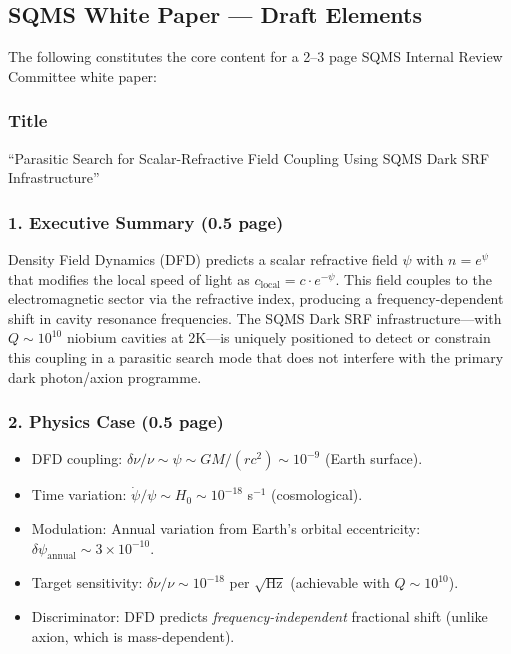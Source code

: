 \documentclass[11pt,a4paper]{article}
\begin{document}
\subsection{SQMS White Paper --- Draft Elements}

The following constitutes the core content for a 2--3 page SQMS Internal Review Committee white paper:

\subsubsection{Title}
``Parasitic Search for Scalar-Refractive Field Coupling Using SQMS Dark SRF Infrastructure''

\subsubsection{1. Executive Summary (0.5 page)}

Density Field Dynamics (DFD) predicts a scalar refractive field $\psi$ with $n = e^\psi$ that modifies the local speed of light as $c_\mathrm{local} = c \cdot e^{-\psi}$. This field couples to the electromagnetic sector via the refractive index, producing a frequency-dependent shift in cavity resonance frequencies. The SQMS Dark SRF infrastructure---with $Q \sim 10^{10}$ niobium cavities at 2K---is uniquely positioned to detect or constrain this coupling in a parasitic search mode that does not interfere with the primary dark photon/axion programme.

\subsubsection{2. Physics Case (0.5 page)}

\begin{itemize}
\item DFD coupling: $\delta\nu / \nu \sim \psi \sim G M / (r c^2) \sim 10^{-9}$ (Earth surface).
\item Time variation: $\dot{\psi} / \psi \sim H_0 \sim 10^{-18}$ s$^{-1}$ (cosmological).
\item Modulation: Annual variation from Earth's orbital eccentricity: $\delta\psi_\mathrm{annual} \sim 3 \times 10^{-10}$.
\item Target sensitivity: $\delta\nu / \nu \sim 10^{-18}$ per $\sqrt{\text{Hz}}$ (achievable with $Q \sim 10^{10}$).
\item Discriminator: DFD predicts \emph{frequency-independent} fractional shift (unlike axion, which is mass-dependent).
\end{itemize}
\end{document}
